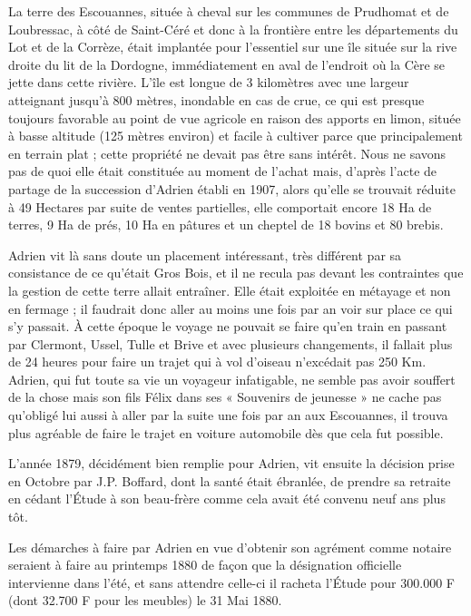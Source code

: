 \documentclass[11pt,a4paper]{report}
\begin{document}
La terre des Escouannes, située à cheval sur les communes de Prudhomat et de Loubressac, à côté de Saint-Céré et donc à la frontière entre les départements du Lot et de la Corrèze, était implantée pour l'essentiel sur une île située sur la rive droite du lit de la Dordogne, immédiatement en aval de l'endroit où la Cère se jette dans cette rivière. L'île est longue de 3 kilomètres avec une largeur atteignant jusqu'à 800 mètres, inondable en cas de crue, ce qui est presque toujours favorable au point de vue agricole en raison des apports en limon, située à basse altitude (125 mètres environ) et facile à cultiver parce que principalement en terrain plat ; cette propriété ne devait pas être sans intérêt. Nous ne savons pas de quoi elle était constituée au moment de l'achat mais, d'après l'acte de partage de la succession d'Adrien établi en 1907, alors qu'elle se trouvait réduite à 49 Hectares par suite de ventes partielles, elle comportait encore 18 Ha de terres, 9 Ha de prés, 10 Ha en pâtures et un cheptel de 18 bovins et 80 brebis.

Adrien vit là sans doute un placement intéressant, très différent par sa consistance de ce qu'était Gros Bois, et il ne recula pas devant les contraintes que la gestion de cette terre allait entraîner. Elle était exploitée en métayage et non en fermage ; il faudrait donc aller au moins une fois par an voir sur place ce qui s'y passait. À cette époque le voyage ne pouvait se faire qu'en train en passant par Clermont, Ussel, Tulle et Brive et avec plusieurs changements, il fallait plus de 24 heures pour faire un trajet qui à vol d'oiseau n'excédait pas 250 Km. Adrien, qui fut toute sa vie un voyageur infatigable, ne semble pas avoir souffert de la chose mais son fils Félix dans ses « Souvenirs de jeunesse » ne cache pas qu'obligé lui aussi à aller par la suite une fois par an aux Escouannes, il trouva plus agréable de faire le trajet en voiture automobile dès que cela fut possible.

L'année 1879, décidément bien remplie pour Adrien, vit ensuite la décision prise en Octobre par J.P. Boffard, dont la santé était ébranlée, de prendre sa retraite en cédant l'Étude à son beau-frère comme cela avait été convenu neuf ans plus tôt.


Les démarches à faire par Adrien en vue d'obtenir son agrément comme notaire seraient à faire au printemps 1880 de façon que la désignation officielle intervienne dans l'été, et sans attendre celle-ci il racheta l'Étude pour 300.000 F (dont 32.700 F pour les meubles) le 31 Mai 1880.
\end{document}
